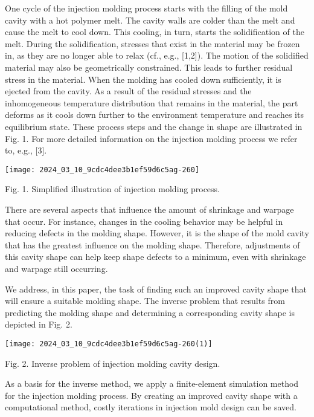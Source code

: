 \documentclass[10pt]{article}
\begin{document}
One cycle of the injection molding process starts with the filling of the mold cavity with a hot polymer melt. The cavity walls are colder than the melt and cause the melt to cool down. This cooling, in turn, starts the solidification of the melt. During the solidification, stresses that exist in the material may be frozen in, as they are no longer able to relax (cf., e.g., [1,2]). The motion of the solidified material may also be geometrically constrained. This leads to further residual stress in the material. When the molding has cooled down sufficiently, it is ejected from the cavity. As a result of the residual stresses and the inhomogeneous temperature distribution that remains in the material, the part deforms as it cools down further to the environment temperature and reaches its equilibrium state. These process steps and the change in shape are illustrated in Fig. 1. For more detailed information on the injection molding process we refer to, e.g., [3].

\begin{center}
\texttt{[image: 2024\_03\_10\_9cdc4dee3b1ef59d6c5ag-260]}
\end{center}

Fig. 1. Simplified illustration of injection molding process.

There are several aspects that influence the amount of shrinkage and warpage that occur. For instance, changes in the cooling behavior may be helpful in reducing defects in the molding shape. However, it is the shape of the mold cavity that has the greatest influence on the molding shape. Therefore, adjustments of this cavity shape can help keep shape defects to a minimum, even with shrinkage and warpage still occurring.

We address, in this paper, the task of finding such an improved cavity shape that will ensure a suitable molding shape. The inverse problem that results from predicting the molding shape and determining a corresponding cavity shape is depicted in Fig. 2.

\begin{center}
\texttt{[image: 2024\_03\_10\_9cdc4dee3b1ef59d6c5ag-260(1)]}
\end{center}

Fig. 2. Inverse problem of injection molding cavity design.

As a basis for the inverse method, we apply a finite-element simulation method for the injection molding process. By creating an improved cavity shape with a computational method, costly iterations in injection mold design can be saved.
\end{document}
